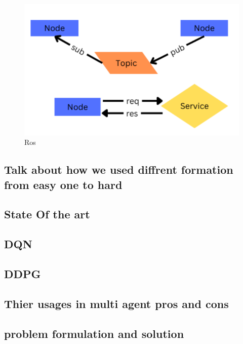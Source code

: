 \documentclass[12pt]{article}
\begin{document}
 
 \begin{figure}[h]  
\centering
\includegraphics[scale=0.4]{ros}
\caption[Ros]{Ros}
\end{figure}








 
   



\subsection{Talk about how we used diffrent formation from easy one to hard}








\subsection{State Of the art}
\subsection{DQN}
\subsection{DDPG}
\subsection{Thier usages in multi agent pros and cons}
\subsection{problem formulation and solution}
\end{document}
